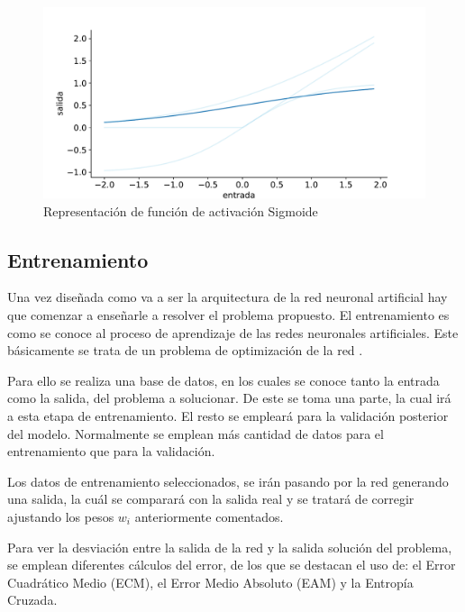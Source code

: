 \begin{itemize}
    \begin{figure}[!ht]
    \centering
    \includegraphics[width=\textwidth]{figuras/desarrollo teorico/sigmoid.pdf}
    \caption{Representación de función de activación Sigmoide}
    \label{fig:sigmoid}
    \end{figure}
    
\end{itemize}



\subsection{Entrenamiento}

Una vez diseñada como va a ser la arquitectura de la red neuronal artificial hay que comenzar a enseñarle a resolver el problema propuesto. El entrenamiento es como se conoce al proceso de aprendizaje de las redes neuronales artificiales. Este básicamente se trata de un problema de optimización de la red \cite{Aggarwal2018_training}.

Para ello se realiza una base de datos, en los cuales se conoce tanto la entrada como la salida, del problema a solucionar. De este se toma una parte, la cual irá a esta etapa de entrenamiento. El resto se empleará para la validación posterior del modelo. Normalmente se emplean más cantidad de datos para el entrenamiento que para la validación.

Los datos de entrenamiento seleccionados, se irán pasando por la red generando una salida, la cuál se comparará con la salida real y se tratará de corregir ajustando los pesos $w_i$ anteriormente comentados.

Para ver la desviación entre la salida de la red y la salida solución del problema, se emplean diferentes cálculos del error, de los que se destacan el uso de: el Error Cuadrático Medio (ECM), el Error Medio Absoluto (EAM) y la Entropía Cruzada.

